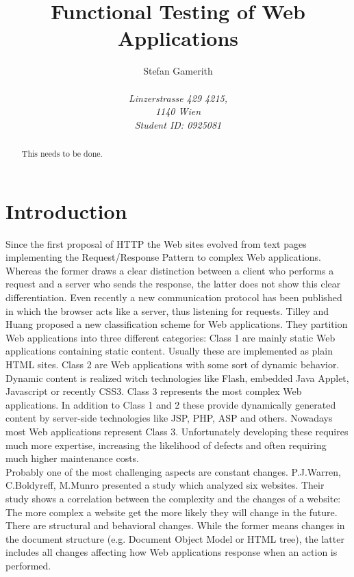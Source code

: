 \documentclass[12pt, notitlepage]{article}
\title{Functional Testing of Web Applications}
\author{Stefan Gamerith\\\\
		\emph{Linzerstrasse 429 4215,}\\
		\emph{1140 Wien}\\
		\emph{Student ID: 0925081}}
\begin{document}
	\maketitle
	\thispagestyle{empty}
	\begin{abstract}
		This needs to be done.
	\end{abstract}
	\newpage
	\thispagestyle{empty}
	\tableofcontents
\newpage
\setcounter{page}{1}

\section*{Introduction}
Since the first proposal of HTTP\cite{http-proposal} the Web sites evolved from 
text pages implementing the Request/Response Pattern\cite{request-response}  to  
complex Web applications. Whereas the former draws a clear distinction between a client
who performs a request and a server who sends the response, the latter does not show this 
clear differentiation. Even recently a new communication protocol\cite{web-socket} has been published 
in which the browser acts like a server, thus listening for requests. Tilley and Huang \cite{web-classification} proposed
a new classification scheme for Web applications. They partition Web applications into three different categories:
Class 1 are mainly static Web applications containing static content. Usually these are implemented as plain HTML sites. 
Class 2 are Web applications with some sort of dynamic behavior. Dynamic content is realized witch technologies like Flash\cite{flash},
embedded Java Applet\cite{java-applet}, Javascript or recently CSS3\cite{css3}. 
Class 3 represents the most complex Web applications. In addition to Class 1 and 2 these provide dynamically generated content by server-side technologies
like JSP, PHP, ASP and others. Nowadays most Web applications represent Class 3. Unfortunately developing these requires much more expertise, increasing the
likelihood of defects and often requiring much higher maintenance costs.\\
Probably one of the most challenging aspects are constant changes. P.J.Warren, C.Boldyreff, M.Munro\cite{html-evolution}
presented a study which analyzed six websites. Their study shows a correlation between the complexity and the changes of
a website: The more complex a website get the more likely they will change in the future. 
There are structural and behavioral changes. While the former means changes in the document structure (e.g. Document Object Model\cite{dom} or HTML tree), the latter
includes all changes affecting how Web applications response when an action is performed. 
\end{document}
